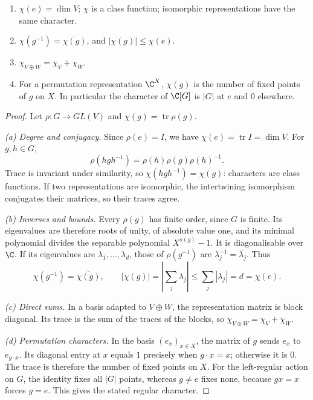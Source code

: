 \begin{proposition}\label{prop:charbasic}
\begin{enumerate}[label=(\alph*)]
\item $\chi(e)=\dim V$; $\chi$ is a class function; isomorphic representations have the same character.
\item $\chi(g^{-1})=\overline{\chi(g)}$, and $|\chi(g)|\le\chi(e)$.
\item $\chi_{V\oplus W}=\chi_V+\chi_W$.
\item For a permutation representation $\C^X$, $\chi(g)$ is the number of fixed points of $g$ on $X$. In particular the character of $\C[G]$ is $|G|$ at $e$ and $0$ elsewhere.
\end{enumerate}
\end{proposition}
\begin{proof}
Let $\rho:G\to GL(V)$ and
$\chi(g)=\operatorname{tr}\rho(g)$.

\emph{(a) Degree and conjugacy.}
Since $\rho(e)=I$, we have
$\chi(e)=\operatorname{tr}I=\dim V$.
For $g,h\in G$,
\[
\rho(hgh^{-1})=
\rho(h)\rho(g)\rho(h)^{-1}.
\]
Trace is invariant under similarity,
so $\chi(hgh^{-1})=\chi(g)$:
characters are class functions.
If two representations are isomorphic,
the intertwining isomorphism conjugates
their matrices, so their traces agree.

\emph{(b) Inverses and bounds.}
Every $\rho(g)$ has finite order,
since $G$ is finite. Its eigenvalues
are therefore roots of unity, of
absolute value one, and its minimal
polynomial divides the separable
polynomial $X^{o(g)}-1$.
It is diagonalisable over $\C$.
If its eigenvalues are
$\lambda_1,\ldots,\lambda_d$,
those of $\rho(g^{-1})$ are
$\lambda_j^{-1}=\overline{\lambda_j}$.
Thus
\[
\chi(g^{-1})=\overline{\chi(g)},
\qquad
|\chi(g)|=\left|\sum_j\lambda_j\right|
\le\sum_j|\lambda_j|=d=\chi(e).
\]

\emph{(c) Direct sums.}
In a basis adapted to $V\oplus W$,
the representation matrix is block
diagonal. Its trace is the sum of
the traces of the blocks, so
$\chi_{V\oplus W}=\chi_V+\chi_W$.

\emph{(d) Permutation characters.}
In the basis $(e_x)_{x\in X}$,
the matrix of $g$ sends $e_x$
to $e_{g\cdot x}$. Its diagonal
entry at $x$ equals $1$ precisely
when $g\cdot x=x$; otherwise it is
$0$. The trace is therefore the
number of fixed points on $X$.
For the left-regular action on $G$,
the identity fixes all $|G|$ points,
whereas $g\ne e$ fixes none, because
$gx=x$ forces $g=e$.
This gives the stated regular
character.
\end{proof}

